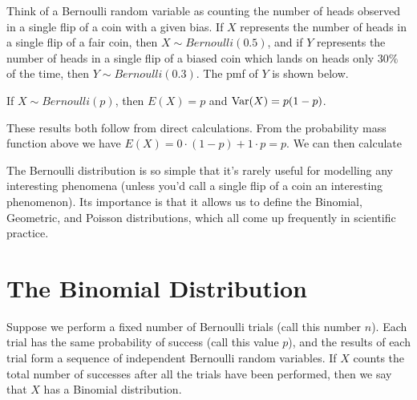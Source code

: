 Think of a Bernoulli random variable as counting the number of heads observed in a single flip of a coin with a given bias. If $X$ represents the number of heads in a single flip of a fair coin, then $X \sim Bernoulli(0.5)$, and if $Y$ represents the number of heads in a single flip of a biased coin which lands on heads only $30\%$ of the time, then $Y \sim Bernoulli(0.3)$. The pmf of $Y$ is shown below.

\begin{center}
\end{center}

\begin{thm}\label{BernoulliExpectation} If $X \sim Bernoulli(p)$, then $E(X) = p$ and $\operatorname{Var}(X) = p(1-p)$.
\end{thm}

\begin{pf} These results both follow from direct calculations. From the probability mass function above we have $E(X) = 0 \cdot (1-p) + 1 \cdot p  = p$. We can then calculate
\end{pf}
\par
The Bernoulli distribution is so simple that it's rarely useful for modelling any interesting phenomena (unless you'd call a single flip of a coin an interesting phenomenon). Its importance is that it allows us to define the Binomial, Geometric, and Poisson distributions, which all come up frequently in scientific practice.

\section{The Binomial Distribution}

Suppose we perform a fixed number of Bernoulli trials (call this number $n$). Each trial has the same probability of success (call this value $p$), and the results of each trial form a sequence of independent Bernoulli random variables. If $X$ counts the total number of successes after all the trials have been performed, then we say that $X$ has a Binomial distribution.

